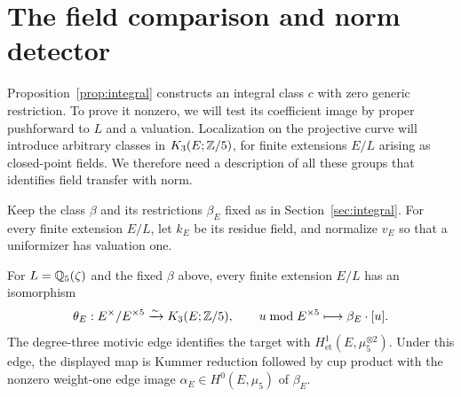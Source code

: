 \section{The field comparison and norm detector}\label{sec:field}

Proposition~\ref{prop:integral} constructs an integral class $c$ with
zero generic restriction. To prove it nonzero, we will test its
coefficient image by proper pushforward to $L$ and a valuation.
Localization on the projective curve will introduce arbitrary classes
in $K_3(E;\mathbb Z/5)$, for finite extensions $E/L$ arising as
closed-point fields.
We therefore need a description of all these groups that identifies
field transfer with norm.

Keep the class $\beta$ and its restrictions $\beta_E$ fixed as in
Section~\ref{sec:integral}. For every finite extension $E/L$, let
$k_E$ be its residue field, and normalize $v_E$ so that a uniformizer
has valuation one.

\begin{lemma}\label{lem:field}
For $L=\mathbb Q_5(\zeta)$ and the fixed $\beta$ above, every finite
extension $E/L$ has an isomorphism
\begin{equation}\label{eq:theta}
 \theta_E:E^\times/E^{\times5}\xrightarrow{\sim}K_3(E;\mathbb Z/5),
 \qquad u\bmod E^{\times5}\longmapsto\beta_E\cdot[u].
\end{equation}
The degree-three motivic edge identifies the target with
$H^1_{\mathrm{et}}(E,\mu_5^{\otimes2})$. Under this edge,
the displayed map is Kummer reduction followed by cup product
with the nonzero weight-one edge image
$\alpha_E\in H^0(E,\mu_5)$ of $\beta_E$.
\end{lemma}

